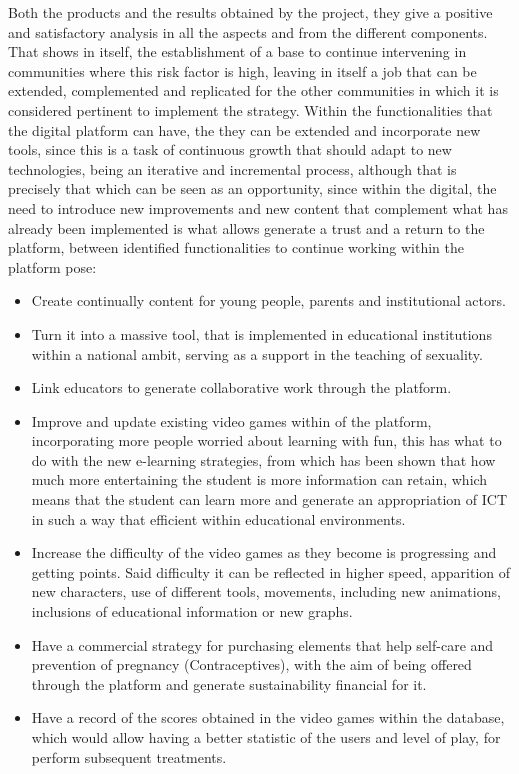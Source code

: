 \documentclass[journal,transmag]{IEEEtran}
\begin{document}
Both the products and the results obtained by the project, they give a positive and satisfactory analysis in all the aspects and from the different components. That shows in itself, the establishment of a base to continue intervening in communities where this risk factor is high, leaving in itself a job that can be extended, complemented and replicated for the other communities in which it is considered pertinent to implement the strategy. Within the functionalities that the digital platform can have, the they can be extended and incorporate new tools, since this is a task of continuous growth that should adapt to new technologies, being an iterative and incremental process, although that is precisely that which can be seen as an opportunity, since within the digital, the need to introduce new improvements and new content that complement what has already been implemented is what allows generate a trust and a return to the platform, between identified functionalities to continue working within the platform pose:

\begin{itemize}
\item Create continually content for young people, parents and institutional actors.
\item Turn it into a massive tool, that is implemented in educational institutions within a national ambit, serving as a support in the teaching of sexuality.
\item Link educators to generate collaborative work through the platform.
\item Improve and update existing video games within of the platform, incorporating more people
worried about learning with fun, this has what to do with the new e-learning strategies, from
which has been shown that how much more entertaining the student is more information can retain, which means that the student can learn more and generate an appropriation of ICT in such a way that efficient within educational environments.
\item Increase the difficulty of the video games as they become is progressing and getting points. Said difficulty it can be reflected in higher speed, apparition of new characters, use of different tools, movements, including new animations, inclusions of educational information or new graphs.
\item Have a commercial strategy for purchasing elements that help self-care and prevention
of pregnancy (Contraceptives), with the aim of being offered through the platform and generate sustainability financial for it.
\item Have a record of the scores obtained in the video games within the database, which would allow having a better statistic of the users and level of play, for perform subsequent treatments.
\end{itemize}



\end{document}
